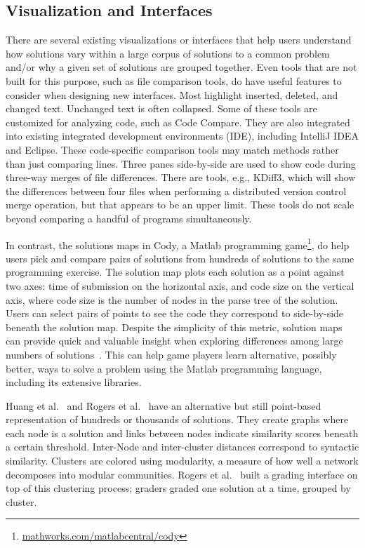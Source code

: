 \subsection{Visualization and Interfaces}

There are several existing visualizations or interfaces that help users understand how solutions vary within a large corpus of solutions to a common problem and/or why a given set of solutions are grouped together. Even tools that are not built for this purpose, such as file comparison tools, do have useful features to consider when designing new interfaces. Most highlight inserted, deleted, and changed text. Unchanged text is often collapsed. Some of these tools are customized for analyzing code, such as Code Compare. They are also integrated into existing integrated development environments (IDE), including IntelliJ IDEA and Eclipse. These code-specific comparison tools may match methods rather than just comparing lines. Three panes side-by-side are used to show code during three-way merges of file differences. There are tools, e.g., KDiff3, which will show the differences between four files when performing a distributed version control merge operation, but that appears to be an upper limit. These tools do not scale beyond comparing a handful of programs simultaneously.


In contrast, the solutions maps in Cody, a Matlab programming game\footnote{\url{mathworks.com/matlabcentral/cody}}, do help users pick and compare pairs of solutions from hundreds of solutions to the same programming exercise. The solution map plots each solution as a point against two axes: time of submission on the horizontal axis, and code size on the vertical axis, where code size is the number of nodes in the parse tree of the solution. Users can select pairs of points to see the code they correspond to side-by-side beneath the solution map. Despite the simplicity of this metric, solution maps can provide quick and valuable insight when exploring differences among large numbers of solutions~\cite{ICERGlassman}. This can help game players learn alternative, possibly better, ways to solve a problem using the Matlab programming language, including its extensive libraries.

Huang et al.~\cite{MOOCshop} and Rogers et al.~\cite{ACESthesis} have an alternative but still point-based representation of hundreds or thousands of solutions. They create graphs where each node is a solution and links between nodes indicate similarity scores beneath a certain threshold. Inter-Node and inter-cluster distances correspond to syntactic similarity. Clusters are colored using modularity, a measure of how well a network decomposes into modular communities. Rogers et al.~\cite{ACESthesis} built a grading interface on top of this clustering process; graders graded one solution at a time, grouped by cluster.

